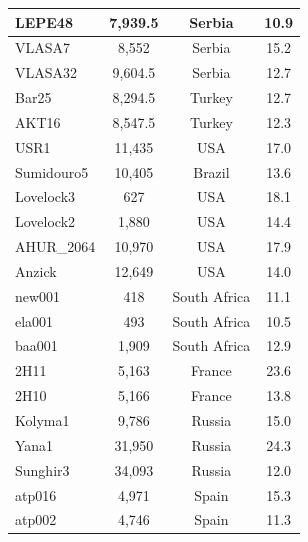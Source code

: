 \begin{longtable}{|l|c|c|c|}
LEPE48 & 7,939.5 & Serbia & 10.9 \\ \hline
VLASA7 & 8,552 & Serbia & 15.2 \\ \hline
VLASA32 & 9,604.5 & Serbia & 12.7 \\ \hline
Bar25 & 8,294.5 & Turkey & 12.7 \\ \hline
AKT16 & 8,547.5 & Turkey & 12.3 \\ \hline
USR1 & 11,435 & USA & 17.0 \\ \hline
Sumidouro5 & 10,405 & Brazil & 13.6 \\ \hline
Lovelock3 & 627 & USA & 18.1 \\ \hline
Lovelock2 & 1,880 & USA & 14.4 \\ \hline
AHUR\_2064 & 10,970 & USA & 17.9 \\ \hline
Anzick & 12,649 & USA & 14.0 \\ \hline
new001 & 418 & South Africa & 11.1 \\ \hline
ela001 & 493 & South Africa & 10.5 \\ \hline
baa001 & 1,909 & South Africa & 12.9 \\ \hline
2H11 & 5,163 & France & 23.6 \\ \hline
2H10 & 5,166 & France & 13.8 \\ \hline
Kolyma1 & 9,786 & Russia & 15.0 \\ \hline
Yana1 & 31,950 & Russia & 24.3 \\ \hline
Sunghir3 & 34,093 & Russia & 12.0 \\ \hline
atp016 & 4,971 & Spain & 15.3 \\ \hline
atp002 & 4,746 & Spain & 11.3
\label{tab:gb_ancient_samples}
\end{longtable}

